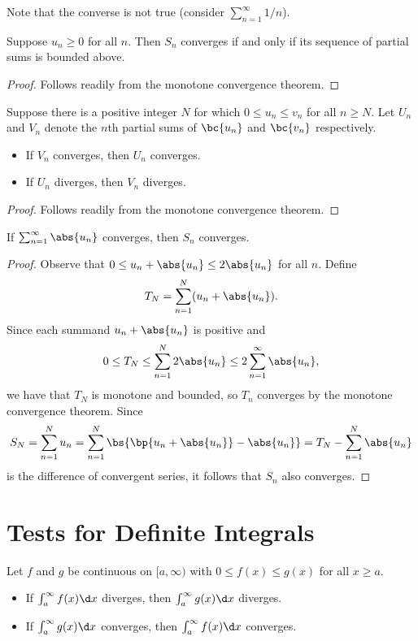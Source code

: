 Note that the converse is not true (consider $\sum_{n = 1}^\infty 1/n$).

\begin{proposition}
    Suppose $u_n \geq 0$ for all $n$. Then $S_n$ converges if and only if its sequence of partial sums is bounded above.
\end{proposition}
\begin{proof}
    Follows readily from the monotone convergence theorem.
\end{proof}

\begin{proposition}
    Suppose there is a positive integer $N$ for which $0 \leq u_n \leq v_n$ for all $n \geq N$. Let $U_n$ and $V_n$ denote the $n$th partial sums of $\bc{u_n}$ and $\bc{v_n}$ respectively.
    \begin{itemize}
        \item If $V_n$ converges, then $U_n$ converges.
        \item If $U_n$ diverges, then $V_n$ diverges.
    \end{itemize}
\end{proposition}
\begin{proof}
    Follows readily from the monotone convergence theorem.
\end{proof}

\begin{proposition}
    If $\sum_{n = 1}^\infty \abs{u_n}$ converges, then $S_n$ converges.
\end{proposition}
\begin{proof}
    Observe that $0 \leq u_n + \abs{u_n} \leq 2 \abs{u_n}$ for all $n$. Define \[T_N = \sum_{n = 1}^N (u_n + \abs{u_n}).\] Since each summand $u_n + \abs{u_n}$ is positive and \[0 \leq T_N \leq \sum_{n = 1}^N 2\abs{u_n} \leq 2\sum_{n=1}^\infty \abs{u_n},\] we have that $T_N$ is monotone and bounded, so $T_n$ converges by the monotone convergence theorem. Since \[S_N = \sum_{n = 1}^N u_n = \sum_{n = 1}^N \bs{\bp{u_n + \abs{u_n}} - \abs{u_n}} = T_N - \sum_{n = 1}^N \abs{u_n}\] is the difference of convergent series, it follows that $S_n$ also converges.
\end{proof}

\section{Tests for Definite Integrals}

\begin{proposition}
    Let $f$ and $g$ be continuous on $[a, \infty)$ with $0 \leq f(x) \leq g(x)$ for all $x \geq a$.
    \begin{itemize}
        \item If $\int_a^\infty f(x) \d x$ diverges, then $\int_a^\infty g(x) \d x$ diverges.
        \item If $\int_a^\infty g(x) \d x$ converges, then $\int_a^\infty f(x) \d x$ converges.
    \end{itemize}
\end{proposition}

